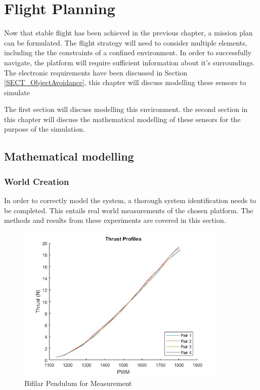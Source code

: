 \chapter{Flight Planning}
	Now that stable flight has been achieved in the previous chapter, a mission plan can be formulated. The flight strategy will need to consider multiple elements, including the the constraints of a confined environment. In order to successfully navigate, the platform will require sufficient information about it's surroundings. The electronic requirements have been discussed in Section \ref{SECT_ObjectAvoidance}, this chapter will discuss modelling these sensors to simulate 
	
	The first section will discuss modelling this environment. the second section in this chapter will discuss the mathematical modelling of these sensors for the purpose of the simulation. 
	
	\section{Mathematical modelling}
		\subsection{World Creation}
		In order to correctly model the system, a thorough system identification needs to be completed. This entails real world measurements of the chosen platform. The methods and results from these experiments are covered in this section.
	
		\begin{figure}[H]
			\centering
			\includegraphics[height = 7.5cm]{../Design/Mechanical/ThrustProfiles/thrustprofiles.jpg}
			\caption{Bifilar Pendulum for Measurement}
			\label{IM_ThrustProfiles}
		\end{figure}
		
